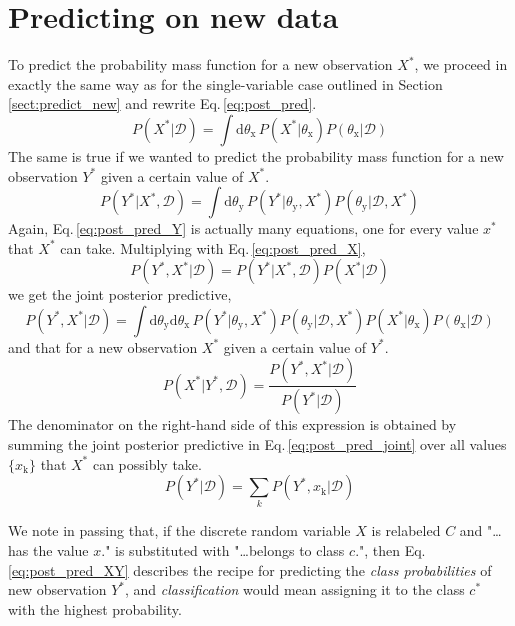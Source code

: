 \documentclass[]{report}
\begin{document}
\section{Predicting on new data}
To predict the probability mass function for a new observation $X^*$, we proceed in exactly the same way as for the single-variable case outlined in Section\,\ref{sect:predict_new} and rewrite Eq.\,\ref{eq:post_pred}.
\begin{equation} \label{eq:post_pred_X}
P(X^*|\mathcal{D}) = \int\mathrm{d}\theta_\mathrm{x}\,P(X^*|\theta_\mathrm{x})P(\theta_\mathrm{x}|\mathcal{D})
\end{equation}
The same is true if we wanted to predict the probability mass function for a new observation $Y^*$ given a certain value of $X^*$.
\begin{equation} \label{eq:post_pred_Y}
P(Y^*|X^*, \mathcal{D}) = \int\mathrm{d}\theta_\mathrm{y}\,P(Y^*|\theta_\mathrm{y}, X^*)P(\theta_\mathrm{y}|\mathcal{D}, X^*)
\end{equation}
Again, Eq.\,\ref{eq:post_pred_Y} is actually many equations, one for every value $x^*$ that $X^*$ can take. Multiplying with Eq.\,\ref{eq:post_pred_X},
\begin{equation}
P(Y^*, X^*|\mathcal{D}) = P(Y^*|X^*, \mathcal{D})P(X^*|\mathcal{D})
\end{equation}
we get the joint posterior predictive,
\begin{equation} \label{eq:post_pred_joint}
P(Y^*, X^*|\mathcal{D}) = \int\mathrm{d}\theta_\mathrm{y}\mathrm{d}\theta_\mathrm{x}\,P(Y^*|\theta_\mathrm{y}, X^*)P(\theta_\mathrm{y}|\mathcal{D}, X^*)P(X^*|\theta_\mathrm{x})P(\theta_\mathrm{x}|\mathcal{D})
\end{equation}
and that for a new observation $X^*$ given a certain value of $Y^*$.
\begin{equation} \label{eq:post_pred_XY}
P(X^*|Y^*, \mathcal{D}) = \frac{P(Y^*, X^*|\mathcal{D})}{P(Y^*|\mathcal{D})}
\end{equation}
The denominator on the right-hand side of this expression is obtained by summing the joint posterior predictive in Eq.\,\ref{eq:post_pred_joint} over all values $\{x_\mathrm{k}\}$ that $X^*$ can possibly take.
\begin{equation}
P(Y^*|\mathcal{D}) = \sum_{k}P(Y^*, x_\mathrm{k}|\mathcal{D})
\end{equation}

We note in passing that, if the discrete random variable $X$ is relabeled $C$ and "\ldots has the value $x$." is substituted with "\ldots belongs to class $c$.", then Eq.\,\ref{eq:post_pred_XY} describes the recipe for predicting the \emph{class probabilities} of new observation $Y^*$, and \emph{classification} would mean assigning it to the class $c^*$ with the highest probability.
\end{document}
